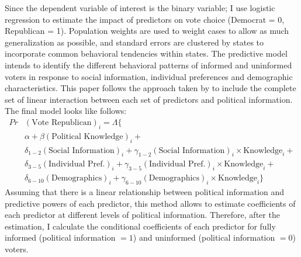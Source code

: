 \documentclass[doc,natbib,12pt]{apa6}\usepackage[]{graphicx}\usepackage[]{color}
\begin{document}
    \par Since the dependent variable of interest is the binary variable; I use logistic regression to estimate the impact of predictors on vote choice (Democrat = 0, Republican = 1). Population weights are used to weight cases to allow as much generalization as possible, and standard errors are clustered by states to incorporate common behavioral tendencies within states. The predictive model intends to identify the different behavioral patterns of informed and uninformed voters in response to social information, individual preferences and demographic characteristics.  This paper follows the approach taken by \cite{Bartels1996unvo} to include the complete set of linear interaction between each set of predictors and political information. The final model looks like follows:
    \begin{align*}
    Pr&(\text{Vote Republican})_i = \Lambda\{\\
    &\alpha + \beta (\text{Political Knowledge})_i +  \\
    &\delta_{1-2} (\text{Social Information})_i + \gamma_{1-2} (\text{Social Information})_i \times \text{Knowledge}_i + \\
    &\delta_{3-5} (\text{Individual Pref.})_i + \gamma_{3-5} (\text{Individual Pref.})_i \times \text{Knowledge}_i + \\
    &\delta_{6-10} (\text{Demographics})_i + \gamma_{6-10} (\text{Demographics})_i \times \text{Knowledge}_i \}
    \end{align*} 
    \noindent Assuming that there is a linear relationship between political information and predictive powers of each predictor, this method allows to estimate coefficients of each predictor at different levels of political information. Therefore, after the estimation, I calculate the conditional coefficients of each predictor for fully informed (political information $= 1$) and uninformed (political information $=0$) voters.
    
    
\end{document}
